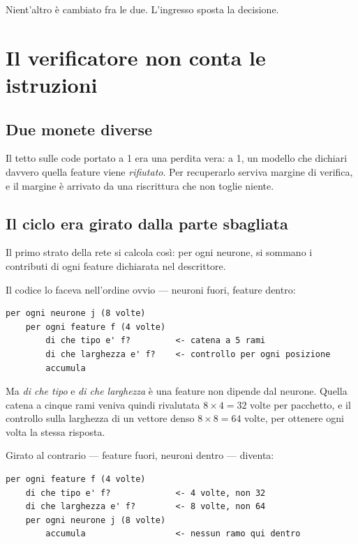 \documentclass[11pt,a4paper,oneside]{report}
\begin{document}
Nient'altro è cambiato fra le due. L'ingresso sposta la decisione.

\chapter{Il verificatore non conta le istruzioni}

\section{Due monete diverse}

Il tetto sulle code portato a 1 era una perdita vera: a 1, un modello che
dichiari davvero quella feature viene \emph{rifiutato}. Per recuperarlo serviva
margine di verifica, e il margine è arrivato da una riscrittura che non toglie
niente.

\section{Il ciclo era girato dalla parte sbagliata}

Il primo strato della rete si calcola così: per ogni neurone, si sommano i
contributi di ogni feature dichiarata nel descrittore.

Il codice lo faceva nell'ordine ovvio --- neuroni fuori, feature dentro:

\begin{lstlisting}
per ogni neurone j (8 volte)
    per ogni feature f (4 volte)
        di che tipo e' f?         <- catena a 5 rami
        di che larghezza e' f?    <- controllo per ogni posizione
        accumula
\end{lstlisting}

Ma \emph{di che tipo} e \emph{di che larghezza} è una feature non dipende dal
neurone. Quella catena a cinque rami veniva quindi rivalutata $8 \times 4 = 32$
volte per pacchetto, e il controllo sulla larghezza di un vettore denso
$8 \times 8 = 64$ volte, per ottenere ogni volta la stessa risposta.

Girato al contrario --- feature fuori, neuroni dentro --- diventa:

\begin{lstlisting}
per ogni feature f (4 volte)
    di che tipo e' f?             <- 4 volte, non 32
    di che larghezza e' f?        <- 8 volte, non 64
    per ogni neurone j (8 volte)
        accumula                  <- nessun ramo qui dentro
\end{lstlisting}
\end{document}

